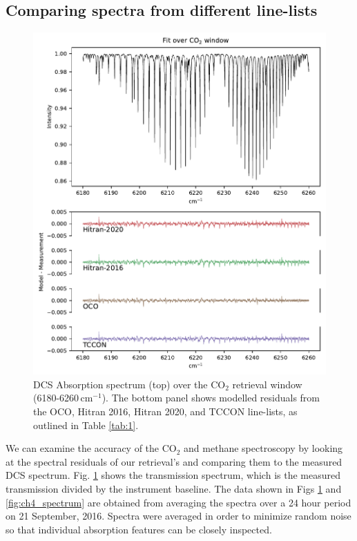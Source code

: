 \documentclass[amt, manuscript]{copernicus}
\begin{document}
\subsection{Comparing spectra from different line-lists }

\begin{figure}
  \centering
  \includegraphics{co2_fit.pdf}
  \caption{DCS Absorption spectrum (top) over the CO$_2$ retrieval window (6180-6260\,cm$^{-1}$). The bottom panel shows modelled residuals from the OCO, Hitran 2016, Hitran 2020, and TCCON line-lists, as outlined in Table \ref{tab:1}. }
  \label{fig:co2_spectrum}
\end{figure}
We can examine the accuracy of the CO$_2$ and methane spectroscopy by looking at the spectral residuals  of our retrieval’s  and comparing them to the measured DCS spectrum. Fig. \ref{fig:co2_spectrum} shows the transmission spectrum, which is the measured transmission divided by the instrument baseline. The data shown in Figs \ref{fig:co2_spectrum} and \ref{fig:ch4_spectrum} are obtained from averaging the spectra over a 24 hour period on 21 September, 2016. Spectra were averaged in order to minimize random noise so that individual absorption features can be closely inspected.
\end{document}
